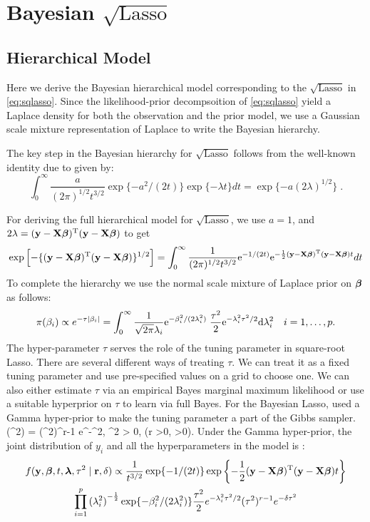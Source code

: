 \documentclass[11pt]{article}
\begin{document}
\section{Bayesian $\sqrt{\text{Lasso}}$ }

\subsection{Hierarchical Model}
Here we derive the Bayesian hierarchical model corresponding to the $\sqrt{\text{Lasso}}$ in \eqref{eq:sqlasso}. Since the likelihood-prior decompsoition of \eqref{eq:sqlasso} yield a Laplace density for both the observation and the prior model, we use a Gaussian scale mixture representation of Laplace to write the Bayesian hierarchy. 

The key step in the Bayesian hierarchy for $\sqrt{\text{Lasso}}$ follows from the well-known identity due to \citet{levy1940certains} given by:
\begin{equation}
  \int_{0}^{\infty} \frac{a}{(2 \pi)^{1/2} t^{3/2}} \exp\{-{a^2}/({2 t})\} \exp\{-\lambda t\} dt = \exp\{-a (2 \lambda)^{1/2} \} \;.\label{eq:levy}
\end{equation}

For deriving the full hierarchical model for $\sqrt{\text{Lasso}}$, we use $a = 1$, and $2\lambda = ({\bf y} - {\bf X} \boldsymbol{\beta})^{{\rm T}}({\bf y} - {\bf X} \boldsymbol{\beta})$ to get 
\begin{equation}
\exp \left[-\{({\bf y} - {\bf X} \boldsymbol{\beta})^{{\rm T}}({\bf y} - {\bf X} \boldsymbol{\beta}) \}^{1/2} \right] = \int_{0}^{\infty} \frac{1}{(2 \pi)^{1/2} t^{3/2}} {\rm e}^{-{1}/({2 t})} {\rm e}^{- \frac{1}{2} ({\bf y} - {\bf X} \boldsymbol{\beta})^{{\rm T}}({\bf y} - {\bf X} \boldsymbol{\beta}) t} dt
\end{equation}
To complete the hierarchy we use the normal scale mixture of Laplace prior on $\boldsymbol{\beta}$ \citep{andrews_scale_1974} as follows:
\[
\pi(\beta_i) \propto e^{-\tau \lvert\beta_i\rvert} = \int_{0}^{\infty} \frac{1}{\sqrt{2\pi} \lambda_i} {\rm e}^{-\beta_i^2/(2\lambda_i^2)} \; \frac{\tau^2}{2} {\rm e}^{-\lambda_i^2\tau^2/2} {\rm d} \lambda_i^2 \quad i = 1, \ldots, p.
\]
The hyper-parameter $\tau$ serves the role of the tuning parameter in square-root Lasso. There are several different ways of treating $\tau$. We can treat it as a fixed tuning parameter and use pre-specified values on a grid to choose one.  We can also either estimate $\tau$ via an empirical Bayes marginal maximum likelihood or use a suitable hyperprior on $\tau$ to learn via full Bayes. For the Bayesian Lasso, \cite{park_bayesian_2008} used a Gamma hyper-prior to make the tuning parameter a part of the Gibbs sampler. 
\beq
\pi(\tau^2) =  (\tau^2)^{r-1} e^{-\delta \tau^2}, \; \tau^2 > 0, \; (r >0, \delta >0).
\eeq
Under the Gamma hyper-prior, the joint distribution of $y_i$ and all the hyperparameters in the model is :
\begin{multline}
f({\bf y}, \boldsymbol{\beta}, t, \boldsymbol{\lambda}, \tau^2 \mid {\bf r}, \delta) \propto 
\frac{1}{t^{3/2}} \exp\{-{1}/({2 t}) \} \exp \left\{- \frac{1}{2} ({\bf y} - {\bf X} \boldsymbol{\beta})^{{\rm T}}({\bf y} - {\bf X} \boldsymbol{\beta}) t \right\} \\
\prod_{i=1}^{p} {(\lambda_i^2)}^{-\frac{1}{2}} \exp\{-\beta_i^2/(2\lambda_i^2)\} \frac{\tau^2}{2} e^{-\lambda_i^2\tau^2/2} (\tau^2)^{r-1} e^{-\delta \tau^2} \label{eq:joint}
\end{multline}
\end{document}
